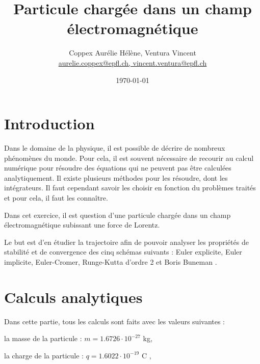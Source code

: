 \documentclass[a4paper,12pt,twoside]{article}
\newcommand{\mail}[1]{{\href{mailto:#1}{#1}}}
\begin{document}
	\title{Particule charg\'ee dans un champ \'electromagn\'etique}
	\author{Coppex Aur\'elie H\'el\`ene, Ventura Vincent\\  %
	{\small \mail{aurelie.coppex@epfl.ch, vincent.ventura@epfl.ch}}}
	\date{\today}\maketitle
	\tableofcontents %




\section{Introduction} %

	Dans le domaine de la physique, il est possible de d\'ecrire de nombreux phénomènes du monde. Pour cela, il est souvent n\'ecessaire de recourir au calcul num\'erique pour r\'esoudre des \'equations qui ne peuvent pas \^etre calcul\'ees analytiquement. Il existe plusieurs m\'ethodes pour les r\'esoudre, dont les int\'egrateurs. Il faut cependant savoir les choisir en fonction du probl\`emes trait\'es et pour cela, il faut les conna\^itre.

	Dans cet exercice, il est question d'une particule charg\'ee dans un champ \'electromagn\'etique subissant une force de Lorentz. 
	
	Le but est d'en \'etudier la trajectoire afin de pouvoir analyser les propri\'et\'es de stabilit\'e et de convergence des cinq sch\'emas suivants : 
	Euler explicite, Euler implicite, Euler-Cromer, Runge-Kutta d'ordre 2 et Boris Buneman \cite{NdC}.
	\newpage

\section{Calculs analytiques}

	Dans cette partie, tous les calculs sont faits avec les valeurs suivantes :
	
	la masse de la particule : $m = 1.6726 \cdot 10^{-27}$ kg, 
	
	la charge de la particule :	$q = 1.6022 \cdot 10^{-19}$ C ,
	
\end{document}
